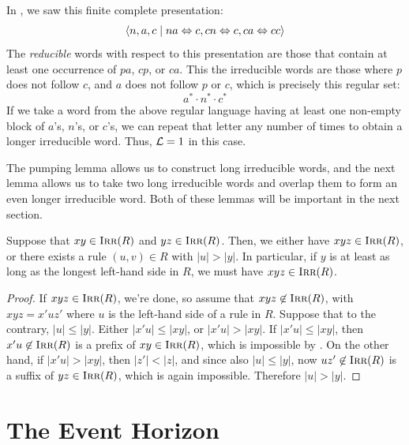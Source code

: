 \documentclass[../generics]{subfiles}
\begin{document}
\begin{example}
In , we saw this finite complete presentation:
\[
\langle n,a,c \mid na \Leftrightarrow c, cn \Leftrightarrow c, ca \Leftrightarrow cc\rangle
\]
The \emph{reducible} words with respect to this presentation are those that contain at least one occurrence of $pa$, $cp$, or $ca$. This the irreducible words are those where $p$ does not follow $c$, and $a$ does not follow $p$ or $c$, which is precisely this regular set:
\[
a^* \cdot n^* \cdot c^*
\]
If we take a word from the above regular language having at least one non-empty block of $a$'s, $n$'s, or $c$'s, we can repeat that letter any number of times to obtain a longer irreducible word. Thus, $\mathcal{L} = 1$ in this case.
\end{example}

The pumping lemma allows us to construct long irreducible words, and the next lemma allows us to take two long irreducible words and overlap them to form an even longer irreducible word. Both of these lemmas will be important in the next section.

\begin{lemma}\label{lemma:irreducible overlap}
Suppose that $xy\in \textsc{Irr}(R)$ and $yz\in\textsc{Irr}(R)$. Then, we either have $xyz\in\textsc{Irr}(R)$, or there exists a rule $(u,v)\in R$ with $|u| > |y|$. In particular, if $y$ is at least as long as the longest left-hand side in $R$, we must have $xyz \in \textsc{Irr}(R)$.
\end{lemma}
\begin{proof}
If $xyz \in \textsc{Irr}(R)$, we're done, so assume that $xyz \not\in \textsc{Irr}(R)$, with $xyz=x'uz'$ where $u$ is the left-hand side of a rule in $R$. Suppose that to the contrary, $|u| \leq |y|$. Either $|x'u| \leq |xy|$, or $|x'u| > |xy|$. If $|x'u| \leq |xy|$, then $x'u \not\in \textsc{Irr}(R)$ is a prefix of $xy \in \textsc{Irr}(R)$, which is impossible by . On the other hand, if $|x'u| > |xy|$, then $|z'| < |z|$, and since also $|u| \leq |y|$, now $uz'\not\in \textsc{Irr}(R)$ is a suffix of $yz \in \textsc{Irr}(R)$, which is again impossible. Therefore $|u| > |y|$.
\end{proof}

\section{The Event Horizon}\label{sec:event horizon}
\end{document}
